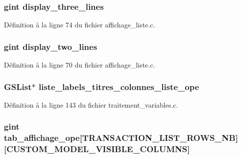 \subsubsection[{display\_\-three\_\-lines}]{\setlength{\rightskip}{0pt plus 5cm}gint {\bf display\_\-three\_\-lines}}\label{affichage__liste_8c_aa74165188c76a0e2ba64239b2236841c}


Définition à la ligne 74 du fichier affichage\_\-liste.c.

\subsubsection[{display\_\-two\_\-lines}]{\setlength{\rightskip}{0pt plus 5cm}gint {\bf display\_\-two\_\-lines}}\label{affichage__liste_8c_a420ccd553ba703004c7415ba8ee25630}


Définition à la ligne 70 du fichier affichage\_\-liste.c.

\subsubsection[{liste\_\-labels\_\-titres\_\-colonnes\_\-liste\_\-ope}]{\setlength{\rightskip}{0pt plus 5cm}GSList$\ast$ {\bf liste\_\-labels\_\-titres\_\-colonnes\_\-liste\_\-ope}}\label{affichage__liste_8c_a53693b9d5a4ba330fa5650e09ef0519f}


Définition à la ligne 143 du fichier traitement\_\-variables.c.

\subsubsection[{tab\_\-affichage\_\-ope}]{\setlength{\rightskip}{0pt plus 5cm}gint {\bf tab\_\-affichage\_\-ope}[TRANSACTION\_\-LIST\_\-ROWS\_\-NB][CUSTOM\_\-MODEL\_\-VISIBLE\_\-COLUMNS]}\label{affichage__liste_8c_a0c444565adac369ff42631d4b7b7e6bb}


